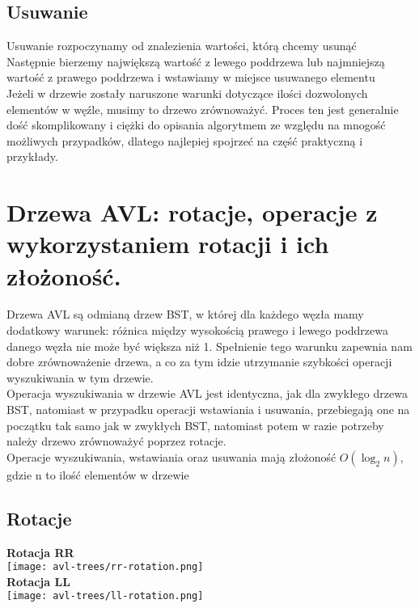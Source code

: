 \documentclass[main.tex]{subfiles}
\begin{document}
    \subsection{Usuwanie}
    Usuwanie rozpoczynamy od znalezienia wartości, którą chcemy usunąć \\
    \noindent Następnie bierzemy największą wartość z lewego poddrzewa lub najmniejszą wartość z prawego poddrzewa i wstawiamy w miejsce usuwanego elementu \\
    \noindent Jeżeli w drzewie zostały naruszone warunki dotyczące ilości dozwolonych elementów w węźle, musimy to drzewo zrównoważyć. Proces ten jest generalnie dość skomplikowany i ciężki do opisania algorytmem ze względu na mnogość możliwych przypadków, dlatego najlepiej spojrzeć na część praktyczną i przykłady.

    \newpage


    \section{Drzewa AVL: rotacje, operacje z wykorzystaniem rotacji i ich złożoność.}
    Drzewa AVL są odmianą drzew BST, w której dla każdego węzła mamy dodatkowy warunek: różnica między wysokością prawego i lewego poddrzewa danego węzła nie może być większa niż 1.
    Spełnienie tego warunku zapewnia nam dobre zrównoważenie drzewa, a co za tym idzie utrzymanie szybkości operacji wyszukiwania w tym drzewie.\\

    \noindent Operacja wyszukiwania w drzewie AVL jest identyczna, jak dla zwykłego drzewa BST, natomiast w przypadku operacji wstawiania i usuwania, przebiegają one na początku tak samo jak w zwykłych BST, natomiast potem w razie potrzeby należy drzewo zrównoważyć poprzez rotacje. \\

    \noindent Operacje wyszukiwania, wstawiania oraz usuwania mają złożoność $O(\log_{2} n)$, gdzie n to ilość elementów w drzewie

    \subsection{Rotacje}
    \begin{multicols}{2}
        \textbf{Rotacja RR} \\

        \texttt{[image: avl-trees/rr-rotation.png]}
        \columnbreak \\
        \textbf{Rotacja LL} \\

        \texttt{[image: avl-trees/ll-rotation.png]}
    \end{multicols}
\end{document}
